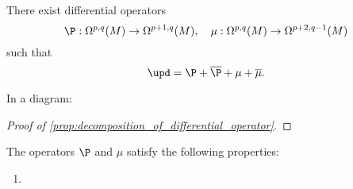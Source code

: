     \begin{proposition}\label{prop:decomposition_of_differential_operator}
        There exist differential operators
        \[ \P: \Omega^{p,q}(M) \to \Omega^{p+1,q}(M), \quad \mu: \Omega^{p,q}(M) \to \Omega^{p+2,q-1}(M) \]
        such that
        \[ \upd = \P + \overline{\P} + \mu + \overline{\mu}. \]
    \end{proposition}

    In a diagram:


    \begin{proof}[Proof of \cref{prop:decomposition_of_differential_operator}]
    \end{proof}

    \begin{proposition}\label{prop:properties_of_differential_operators}
        The operators \(\P\) and \(\mu\) satisfy the following properties:
        \begin{enumerate}
            \item 
        \end{enumerate}
    \end{proposition}